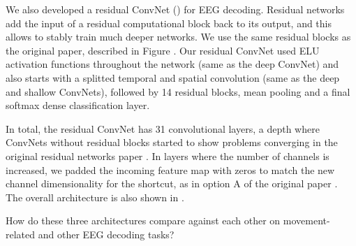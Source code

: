     We also developed a residual ConvNet (\citep{he_deep_2015})
for EEG decoding. Residual networks add the input of a residual
computational block back to its output, and this allows to stably train
much deeper networks. We use the same residual blocks as the original
paper, described in Figure . Our
residual ConvNet used ELU activation functions throughout the network
(same as the deep ConvNet) and also starts with a splitted temporal and
spatial convolution (same as the deep and shallow ConvNets), followed by
14 residual blocks, mean pooling and a final softmax dense
classification layer.

In total, the residual ConvNet has 31 convolutional layers, a depth
where ConvNets without residual blocks started to show problems
converging in the original residual networks paper
\citep{he_deep_2015}. In layers where the number of channels
is increased, we padded the incoming feature map with zeros to match the
new channel dimensionality for the shortcut, as in option A of the
original paper \citep{he_deep_2015}. The overall architecture is also shown in
.

\begin{openbox}
\item How do these three architectures compare against each other on movement-related and other EEG decoding tasks?
\end{openbox}

